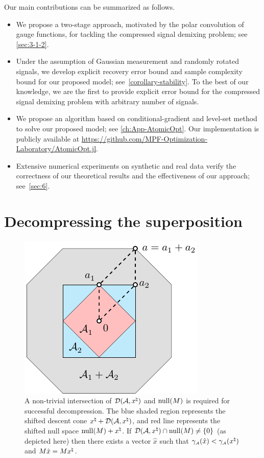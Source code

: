 Our main contributions can be summarized as follows.
\begin{itemize}
  \item We propose a two-stage approach, motivated by the polar convolution of gauge functions, for tackling the compressed signal demixing problem; see \autoref{sec:3-1-2}.
  \item Under the assumption of Gaussian measurement and randomly rotated signals, we develop explicit recovery error bound and sample complexity bound for our proposed model; see~\autoref{corollary-stability}. To the best of our knowledge, we are the first to provide explicit error bound for the compressed signal demixing problem with arbitrary number of signals. 
  \item We propose an algorithm based on conditional-gradient and level-set method to solve our proposed model; see \autoref{ch:App-AtomicOpt}. Our implementation is publicly available at \url{https://github.com/MPF-Optimization-Laboratory/AtomicOpt.jl}. 
  \item Extensive numerical experiments on synthetic and real data verify the correctness of our theoretical results and the effectiveness of our approach; see~\autoref{sec:6}.  
\end{itemize}


\section{Decompressing the superposition}\label{sec:2} 

\begin{figure}[t]
    \centering
   \includegraphics[page=7]{./figures/illustrations2} 
  \caption{A non-trivial intersection of $\mathcal{D}(\mathcal{A}, x^{\natural})$ and $\operatorname{null}(M)$ is required for successful decompression. The blue shaded region represents the shifted descent cone $x^{\natural} + \mathcal{D}(\mathcal{A}, x^{\natural})$, and red line represents the shifted null space $\operatorname{null}(M) + x^{\natural}$. If $\mathcal{D}(\mathcal{A}, x^{\natural}) \cap \operatorname{null}(M) \neq \{0\}$ (as depicted here) then there exists a vector $\hat x$ such that  $\gamma_{\scriptscriptstyle\mathcal{A}}(\hat x) < \gamma_{\scriptscriptstyle\mathcal{A}}(x^{\natural})$ and $M\hat x = Mx^{\natural}$.\label{fig:descent-cone}}
\end{figure}

